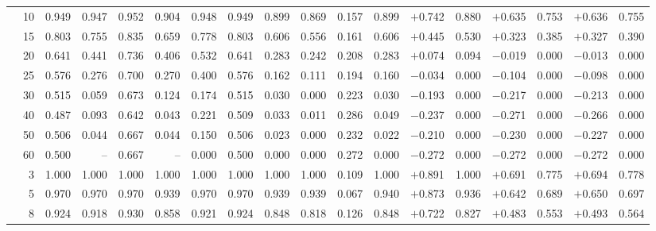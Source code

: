 \documentclass[conference]{IEEEtran}
\theoremstyle{remark}
\begin{document}
\begin{table}[ht]
{\begin{tabular}{p{2.2cm}r rrrr rr rr rr rr rr rr}
  & 10 & 0.949 & 0.947 & 0.952 & 0.904 & 0.948 & 0.949 & 0.899 & 0.869 & 0.157 & 0.899 & $+$0.742 & 0.880 & $+$0.635 & 0.753 & $+$0.636 & 0.755 \\
  & 15 & 0.803 & 0.755 & 0.835 & 0.659 & 0.778 & 0.803 & 0.606 & 0.556 & 0.161 & 0.606 & $+$0.445 & 0.530 & $+$0.323 & 0.385 & $+$0.327 & 0.390 \\
  & 20 & 0.641 & 0.441 & 0.736 & 0.406 & 0.532 & 0.641 & 0.283 & 0.242 & 0.208 & 0.283 & $+$0.074 & 0.094 & $-$0.019 & 0.000 & $-$0.013 & 0.000 \\
  & 25 & 0.576 & 0.276 & 0.700 & 0.270 & 0.400 & 0.576 & 0.162 & 0.111 & 0.194 & 0.160 & $-$0.034 & 0.000 & $-$0.104 & 0.000 & $-$0.098 & 0.000 \\
  & 30 & 0.515 & 0.059 & 0.673 & 0.124 & 0.174 & 0.515 & 0.030 & 0.000 & 0.223 & 0.030 & $-$0.193 & 0.000 & $-$0.217 & 0.000 & $-$0.213 & 0.000 \\
  & 40 & 0.487 & 0.093 & 0.642 & 0.043 & 0.221 & 0.509 & 0.033 & 0.011 & 0.286 & 0.049 & $-$0.237 & 0.000 & $-$0.271 & 0.000 & $-$0.266 & 0.000 \\
  & 50 & 0.506 & 0.044 & 0.667 & 0.044 & 0.150 & 0.506 & 0.023 & 0.000 & 0.232 & 0.022 & $-$0.210 & 0.000 & $-$0.230 & 0.000 & $-$0.227 & 0.000 \\
  & 60 & 0.500 & -- & 0.667 & -- & 0.000 & 0.500 & 0.000 & 0.000 & 0.272 & 0.000 & $-$0.272 & 0.000 & $-$0.272 & 0.000 & $-$0.272 & 0.000 \\
\midrule
{}
  & 3  & 1.000 & 1.000 & 1.000 & 1.000 & 1.000 & 1.000 & 1.000 & 1.000 & 0.109 & 1.000 & $+$0.891 & 1.000 & $+$0.691 & 0.775 & $+$0.694 & 0.778 \\
  & 5  & 0.970 & 0.970 & 0.970 & 0.939 & 0.970 & 0.970 & 0.939 & 0.939 & 0.067 & 0.940 & $+$0.873 & 0.936 & $+$0.642 & 0.689 & $+$0.650 & 0.697 \\
  & 8  & 0.924 & 0.918 & 0.930 & 0.858 & 0.921 & 0.924 & 0.848 & 0.818 & 0.126 & 0.848 & $+$0.722 & 0.827 & $+$0.483 & 0.553 & $+$0.493 & 0.564 \\

\end{tabular}}
\end{table}
\end{document}
